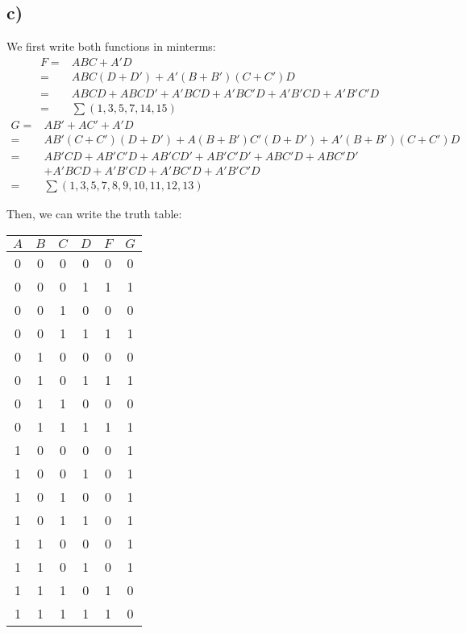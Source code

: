 \documentclass[a4paper,12pt]{article}
\begin{document}
\subsection*{c)}

We first write both functions in minterms:
\begin{align*}
	F =& ABC+A'D\\
	=& ABC(D+D') + A'(B+B')(C+C')D\\
	=& ABCD + ABCD' + A'BCD + A'BC'D + A'B'CD + A'B'C'D\\
	=& \sum(1,3,5,7,14,15)
\end{align*}
\begin{align*}
	G =& AB'+AC'+A'D\\
	=& AB'(C+C')(D+D') + A(B+B')C'(D+D') + A'(B+B')(C+C')D\\
	=& AB'CD + AB'C'D + AB'CD' + AB'C'D' + ABC'D + ABC'D'\\
	 &+ A'BCD + A'B'CD + A'BC'D + A'B'C'D\\
	=& \sum(1,3,5,7,8,9,10,11,12,13)
\end{align*}

Then, we can write the truth table:
\begin{center}
	\begin{tabular}{cccccc}
		\toprule
		$A$ & $B$ & $C$ & $D$ & $F$ & $G$\\
		\midrule
		0 & 0 & 0 & 0 & 0 & 0 \\ 
        0 & 0 & 0 & 1 & 1 & 1 \\ 
        0 & 0 & 1 & 0 & 0 & 0 \\ 
        0 & 0 & 1 & 1 & 1 & 1 \\ 
        0 & 1 & 0 & 0 & 0 & 0 \\ 
        0 & 1 & 0 & 1 & 1 & 1 \\ 
        0 & 1 & 1 & 0 & 0 & 0 \\ 
        0 & 1 & 1 & 1 & 1 & 1 \\ 
        1 & 0 & 0 & 0 & 0 & 1 \\ 
        1 & 0 & 0 & 1 & 0 & 1 \\ 
        1 & 0 & 1 & 0 & 0 & 1 \\ 
        1 & 0 & 1 & 1 & 0 & 1 \\ 
        1 & 1 & 0 & 0 & 0 & 1 \\ 
        1 & 1 & 0 & 1 & 0 & 1 \\ 
        1 & 1 & 1 & 0 & 1 & 0 \\ 
        1 & 1 & 1 & 1 & 1 & 0 \\ 
		\bottomrule
	\end{tabular}
\end{center}
\end{document}
